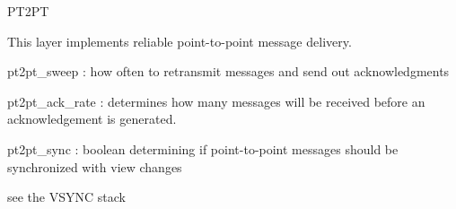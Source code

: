 \begin{Layer}{PT2PT} 

This layer implements reliable point-to-point message delivery.


\begin{Parameters}
\item
pt2pt\_sweep : how often to retransmit messages and send out acknowledgments
\item 
pt2pt\_ack\_rate : determines how many messages will be received before an
acknowledgement is generated.
\item 
pt2pt\_sync : boolean determining if point-to-point messages should be
synchronized with view changes
\end{Parameters}

\begin{Testing}
\item see the VSYNC stack
\end{Testing}
\end{Layer}
